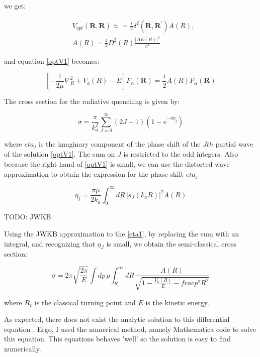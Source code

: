 we get:

\begin{equation}
\begin{split}
& V_{opt}(\mathbf{R},\mathbf{R}) \approx = \frac{i}{2}\delta^2\left(\mathbf{R},\mathbf{R}^{'}\right)A(R), \\[.8em]
& A(R) = \frac{4}{3}D^2(R)\frac{\left|\Delta E(R)\right|^3}{c^3}
\end{split}
\end{equation}

and equation \eqref{optV1} becomes:

\begin{equation}\label{optApprox}
\left[-\frac{1}{2\mu}\nabla_R^2 + V_a(R) - E\right]F_{\alpha}(\mathbf{R}) = \frac{i}{2}A(R)F_{\alpha}(\mathbf{R})
\end{equation}

The cross section for the radiative quenching is given by:

\begin{equation}
\sigma = \frac{\pi}{k_a^2}\sum_{J=0}^{\infty}{(2J+1)\left(1-e^{-4\eta_j}\right) }
\end{equation}

where $ eta_j $ is the imaginary component of the phase shift of the $ Jth $ partial wave of the solution \eqref{optV1}. The sum on $ J $ is restricted to the odd integers. 
Also because the right hand of \eqref{optV1} is small, we can use the distorted wave approximation to obtain the expression for the phase shift $ eta_j $

\begin{equation}\label{eta1}
\eta_j = \frac{\pi\mu}{2k_a}\int_0^{\infty}{dR\,\left|s_J\left(k_aR\right)\right|^2A(R) }
\end{equation}

TODO: JWKB

Using the JWKB approximation to the \eqref{eta1}, by replacing the sum with an integral, and recognizing that $ \eta_J $ is small, we obtain the semi-classical cross section:

\begin{equation}\label{sccs}
\sigma = 2\pi\sqrt{\frac{2\pi}{E}}\int{dp\,p}\int_{R_c}^{\infty}{dR \frac{A(R)}{\sqrt{1-\frac{V_a(R)}{E}-frac{p^2}{R^2}}}}
\end{equation}

where $ R_c $ is the classical turning point and $ E $ is the kinetic energy.

As expected, there does not exist the analytic solution to this  differential equation . Ergo, I used the numerical method, namely Mathematica code to solve this equation. This equations behaves  'well' so the solution is easy to find numerically. 

